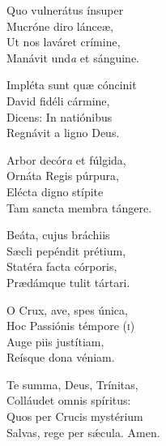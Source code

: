 Quo vulnerátus ínsuper\\
Mucróne diro lánceæ,\\
Ut nos laváret crímine,\\
Manávit und\textit{a} et sánguine.

Impléta sunt quæ cóncinit\\
David fidéli cármine,\\
Dicens: In natiónibus\\
Regnávit a ligno Deus.

Arbor decór\textit{a} et fúlgida,\\
Ornáta Regis púrpura,\\
Elécta digno stípite\\
Tam sancta membra tángere.

Beáta, cujus bráchiis\\
Sæcli pepéndit prétium,\\
Statéra facta córporis,\\
Prædámque tulit tártari.

O Crux, ave, spes única, \\
Hoc Passiónis témpore (\textsc{i}) \\
Auge piis justítiam,\\
Reísque dona véniam.

Te summa, Deus, Trínitas,\\
Colláudet omnis spíritus:\\
Quos per Crucis mystérium\\
Salvas, rege per sǽcula.
Amen.

%
